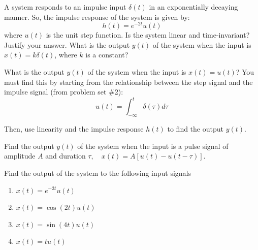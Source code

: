 \documentclass{ee102_pset}
\author{\rule{3cm}{0.4pt}} %
\begin{document}
A system responds to an impulse input $\delta(t)$ in an exponentially decaying manner. So, the impulse response of the system is given by:
\[
h(t) = e^{-2t}u(t)
\]
where $u(t)$ is the unit step function.
\problempart [10 points] Is the system linear and time-invariant? Justify your answer.
\problempart[10 points] What is the output $y(t)$ of the system when the input is $x(t) = k \delta(t)$, where $k$ is a constant?

\problempart[20 points] What is the output $y(t)$ of the system when the input is $x(t) = u(t)$? You must find this by starting from the relationship between the step signal and the impulse signal (from problem set \#2): 
\[
u(t) = \int_{-\infty}^{t} \delta(\tau) d\tau
\]

Then, use linearity and the impulse response $h(t)$ to find the output $y(t)$.

\problempart[20 points] Find the output $y(t)$ of the system when the input is a pulse signal of amplitude $A$ and duration $\tau, \quad x(t) = A[u(t) - u(t-\tau)]$.

 Find the output of the system to the following input signals
\begin{enumerate}
    \item $x(t) = e^{-3t}u(t)$
    \item $x(t) = \cos(2t)u(t)$
    \item $x(t) = \sin(4t)u(t)$
    \item $x(t) = t u(t)$
\end{enumerate}
\end{document}

